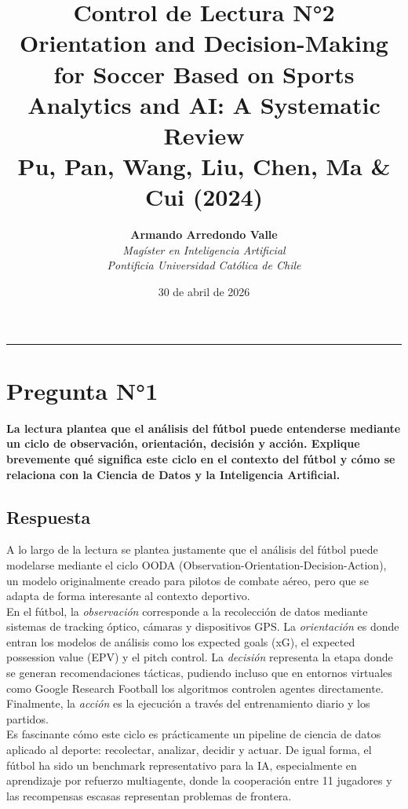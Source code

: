 \documentclass[12pt,a4paper]{article}
\title{\vspace{-1cm}
\huge\textbf{Control de Lectura N°2} \\
\Large\textbf{Orientation and Decision-Making for Soccer Based on Sports Analytics and AI: A Systematic Review} \\
\vspace{0.5cm}
\large{Pu, Pan, Wang, Liu, Chen, Ma \& Cui (2024)}}
\author{\textbf{Armando Arredondo Valle} \\
\textit{Magíster en Inteligencia Artificial} \\
\textit{Pontificia Universidad Católica de Chile}}
\date{30 de abril de 2026}
\begin{document}
\maketitle
\thispagestyle{fancy}

\vspace{0.5cm}

\vspace{0.5cm}
\hrule
\vspace{0.5cm}

\section*{Pregunta N°1}
\textbf{La lectura plantea que el análisis del fútbol puede entenderse mediante un ciclo de observación, orientación, decisión y acción. Explique brevemente qué significa este ciclo en el contexto del fútbol y cómo se relaciona con la Ciencia de Datos y la Inteligencia Artificial.}

\subsection*{Respuesta}
A lo largo de la lectura se plantea justamente que el análisis del fútbol puede modelarse mediante el ciclo OODA (Observation-Orientation-Decision-Action), un modelo originalmente creado para pilotos de combate aéreo, pero que se adapta de forma interesante al contexto deportivo.\\

En el fútbol, la \textit{observación} corresponde a la recolección de datos mediante sistemas de tracking óptico, cámaras y dispositivos GPS. La \textit{orientación} es donde entran los modelos de análisis como los expected goals (xG), el expected possession value (EPV) y el pitch control. La \textit{decisión} representa la etapa donde se generan recomendaciones tácticas, pudiendo incluso que en entornos virtuales como Google Research Football los algoritmos controlen agentes directamente. Finalmente, la \textit{acción} es la ejecución a través del entrenamiento diario y los partidos.\\

Es fascinante cómo este ciclo es prácticamente un pipeline de ciencia de datos aplicado al deporte: recolectar, analizar, decidir y actuar. De igual forma, el fútbol ha sido un benchmark representativo para la IA, especialmente en aprendizaje por refuerzo multiagente, donde la cooperación entre 11 jugadores y las recompensas escasas representan problemas de frontera.
\end{document}
